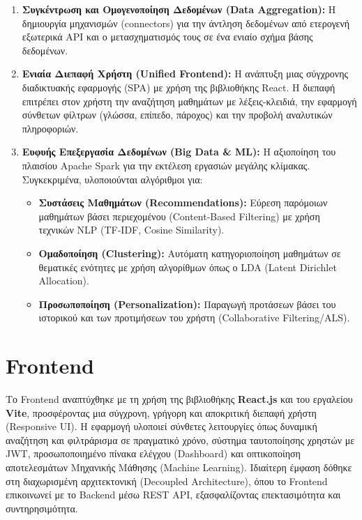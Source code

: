 \documentclass[a4paper,12pt]{article}
\begin{document}
\begin{enumerate}
    \item \textbf{Συγκέντρωση και Ομογενοποίηση Δεδομένων (Data Aggregation):} 
    Η δημιουργία μηχανισμών (connectors) για την άντληση δεδομένων από ετερογενή εξωτερικά API και ο μετασχηματισμός τους σε ένα ενιαίο σχήμα βάσης δεδομένων.
    \item \textbf{Ενιαία Διεπαφή Χρήστη (Unified Frontend):} 
    Η ανάπτυξη μιας σύγχρονης διαδικτυακής εφαρμογής (SPA) με χρήση της βιβλιοθήκης React. Η διεπαφή επιτρέπει στον χρήστη την αναζήτηση μαθημάτων με λέξεις-κλειδιά, την εφαρμογή σύνθετων φίλτρων (γλώσσα, επίπεδο, πάροχος) και την προβολή αναλυτικών πληροφοριών.    
    \item \textbf{Ευφυής Επεξεργασία Δεδομένων (Big Data \& ML):} 
    Η αξιοποίηση του πλαισίου Apache Spark για την εκτέλεση εργασιών μεγάλης κλίμακας. Συγκεκριμένα, υλοποιούνται αλγόριθμοι για:
    \begin{itemize}
        \item \textbf{Συστάσεις Μαθημάτων (Recommendations):} Εύρεση παρόμοιων μαθημάτων βάσει περιεχομένου (Content-Based Filtering) με χρήση τεχνικών NLP (TF-IDF, Cosine Similarity).
        \item \textbf{Ομαδοποίηση (Clustering):} Αυτόματη κατηγοριοποίηση μαθημάτων σε θεματικές ενότητες με χρήση αλγορίθμων όπως ο LDA (Latent Dirichlet Allocation).
        \item \textbf{Προσωποποίηση (Personalization):} Παραγωγή προτάσεων βάσει του ιστορικού και των προτιμήσεων του χρήστη (Collaborative Filtering/ALS).
    \end{itemize}
\end{enumerate}

\section{Frontend}
Το Frontend αναπτύχθηκε με τη χρήση της βιβλιοθήκης \textbf{React.js} και του εργαλείου \textbf{Vite}, προσφέροντας μια σύγχρονη, γρήγορη και αποκριτική διεπαφή χρήστη (Responsive UI). Η εφαρμογή υλοποιεί σύνθετες λειτουργίες όπως δυναμική αναζήτηση και φιλτράρισμα σε πραγματικό χρόνο, σύστημα ταυτοποίησης χρηστών με JWT, προσωποποιημένο πίνακα ελέγχου (Dashboard) και οπτικοποίηση αποτελεσμάτων Μηχανικής Μάθησης (Machine Learning). Ιδιαίτερη έμφαση δόθηκε στη διαχωρισμένη αρχιτεκτονική (Decoupled Architecture), όπου το Frontend επικοινωνεί με το Backend μέσω REST API, εξασφαλίζοντας επεκτασιμότητα και συντηρησιμότητα.
\end{document}

